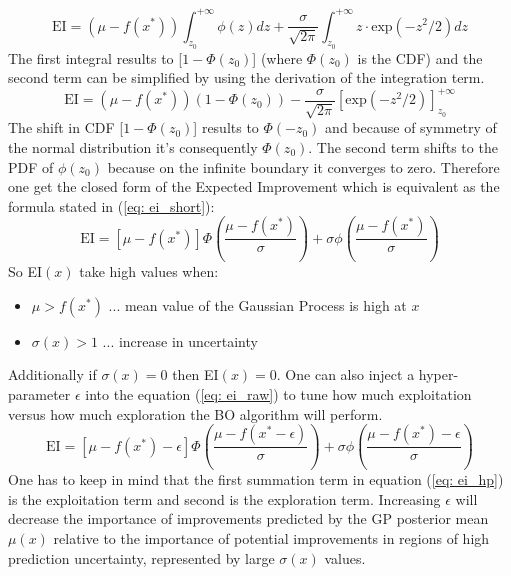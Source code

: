 \documentclass[12pt, a4paper]{article}
\begin{document}
\begin{equation}
    \text{EI} = (\mu - f(x^{\ast})) \int_{z_0}^{+ \infty} \phi(z) dz + \frac{\sigma}{\sqrt{2\pi}}\int_{z_0}^{+ \infty} z \cdot \text{exp}(-z^2/2) dz
\end{equation}
The first integral results to [$1 - \Phi(z_0)$] (where $\Phi(z_0)$ is the CDF) and the second term can be simplified by using the derivation of the integration term.
\begin{equation}
    \text{EI} = (\mu - f(x^{\ast})) (1 - \Phi(z_0)) - \frac{\sigma}{\sqrt{2\pi}} [\text{exp}(-z^2/2)]_{z_0}^{+ \infty}
\end{equation}
The shift in CDF [$1 - \Phi(z_0)$] results to $\Phi(- z_0)$ and because of symmetry of the normal distribution it's consequently $\Phi(z_0)$. The second term shifts to the PDF of $\phi(z_0)$ because on the infinite boundary it converges to zero.
Therefore one get the closed form of the Expected Improvement which is equivalent as the formula stated in (\ref{eq: ei_short}):
\begin{equation}
\label{eq: ei_raw}
    \text{EI} = [\mu - f(x^{\ast})] \Phi \left(\frac{\mu - f(x^{\ast})}{\sigma}\right) + \sigma \phi \left (\frac{\mu - f(x^{\ast})}{\sigma} \right)
\end{equation}
So EI$(x)$ take high values when:
\begin{itemize}
    \item $\mu > f(x^{\ast})$ ... mean value of the Gaussian Process is high at $x$
    \item $\sigma(x) > 1$ ... increase in uncertainty
\end{itemize}
Additionally if $\sigma(x) = 0$ then EI$(x) = 0$.
One can also inject a hyper-parameter $\epsilon$ into the equation (\ref{eq: ei_raw}) to tune how much exploitation versus how much exploration the BO algorithm will perform.
\begin{equation}
\label{eq: ei_hp}
        \text{EI} = [\mu - f(x^{\ast}) - \epsilon] \Phi\left(\frac{\mu - f(x^{\ast} - \epsilon)}{\sigma} \right) + \sigma \phi\left(\frac{\mu - f(x^{\ast}) - \epsilon}{\sigma}\right)
\end{equation}
One has to keep in mind that the first summation term in equation (\ref{eq: ei_hp}) is the exploitation term and second is the exploration term. Increasing $\epsilon$ will decrease the importance of improvements predicted by the GP posterior mean $\mu(x)$ relative to the importance of potential improvements in regions of high prediction uncertainty, represented by large $\sigma(x)$ values.
\end{document}
